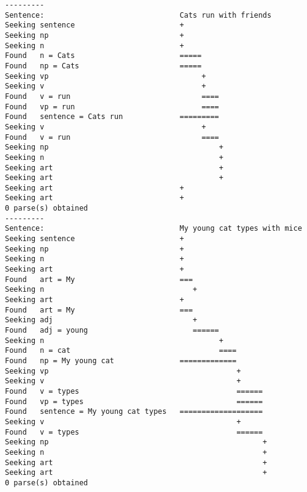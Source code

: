 \documentclass[ruled]{article}
\begin{document}
\begin{verbatim}
---------
Sentence:                               Cats run with friends
Seeking sentence                        +
Seeking np                              +
Seeking n                               +
Found   n = Cats                        =====
Found   np = Cats                       =====
Seeking vp                                   +
Seeking v                                    +
Found   v = run                              ====
Found   vp = run                             ====
Found   sentence = Cats run             =========
Seeking v                                    +
Found   v = run                              ====
Seeking np                                       +
Seeking n                                        +
Seeking art                                      +
Seeking art                                      +
Seeking art                             +
Seeking art                             +
0 parse(s) obtained
---------
Sentence:                               My young cat types with mice
Seeking sentence                        +
Seeking np                              +
Seeking n                               +
Seeking art                             +
Found   art = My                        ===
Seeking n                                  +
Seeking art                             +
Found   art = My                        ===
Seeking adj                                +
Found   adj = young                        ======
Seeking n                                        +
Found   n = cat                                  ====
Found   np = My young cat               =============
Seeking vp                                           +
Seeking v                                            +
Found   v = types                                    ======
Found   vp = types                                   ======
Found   sentence = My young cat types   ===================
Seeking v                                            +
Found   v = types                                    ======
Seeking np                                                 +
Seeking n                                                  +
Seeking art                                                +
Seeking art                                                +
0 parse(s) obtained

\end{verbatim}
\end{document}
